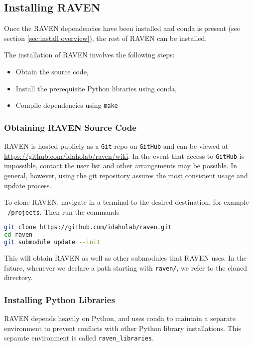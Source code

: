 \subsection{Installing RAVEN}
\label{sec:clone raven}

Once the RAVEN dependencies have been installed  and conda is present
(see section \ref{sec:install overview}), the rest of RAVEN can be installed.

The installation of RAVEN involves the following steps:
\begin{itemize}
  \item Obtain the source code,
  \item Install the prerequisite Python libraries using conda,
  \item Compile dependencies using \texttt{make}
\end{itemize}




\subsubsection{Obtaining RAVEN Source Code}
RAVEN is hosted publicly as a \texttt{Git} repo on \texttt{GitHub}
and can be viewed at \url{https://github.com/idaholab/raven/wiki}.
In the event that access to \texttt{GitHub} is impossible, contact the user list and other arrangements may be
possible.  In general, however, using the git repository assures the most consistent usage and update process.

To clone RAVEN, navigate in a terminal to the desired destination, for example \texttt{~/projects}.  Then run
the commands
\begin{lstlisting}[language=bash]
git clone https://github.com/idaholab/raven.git
cd raven
git submodule update --init
\end{lstlisting}
This will obtain RAVEN as well as other submodules that RAVEN uses.  In the future, whenever we declare a path
starting with \texttt{raven/}, we refer to the cloned directory.




\subsubsection{Installing Python Libraries}
RAVEN depends heavily on Python, and uses conda to maintain a separate environment to prevent conflicts with
other Python library installations.  This separate environment is called \texttt{raven\_libraries}.


